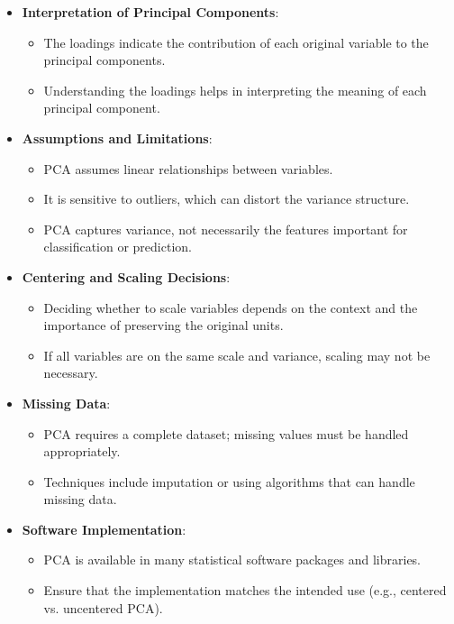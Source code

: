\documentclass{article}
\begin{document}
\begin{itemize}
    \item \textbf{Interpretation of Principal Components}:
    \begin{itemize}
        \item The loadings indicate the contribution of each original variable to the principal components.
        \item Understanding the loadings helps in interpreting the meaning of each principal component.
    \end{itemize}
    \item \textbf{Assumptions and Limitations}:
    \begin{itemize}
        \item PCA assumes linear relationships between variables.
        \item It is sensitive to outliers, which can distort the variance structure.
        \item PCA captures variance, not necessarily the features important for classification or prediction.
    \end{itemize}
    \item \textbf{Centering and Scaling Decisions}:
    \begin{itemize}
        \item Deciding whether to scale variables depends on the context and the importance of preserving the original units.
        \item If all variables are on the same scale and variance, scaling may not be necessary.
    \end{itemize}
    \item \textbf{Missing Data}:
    \begin{itemize}
        \item PCA requires a complete dataset; missing values must be handled appropriately.
        \item Techniques include imputation or using algorithms that can handle missing data.
    \end{itemize}
    \item \textbf{Software Implementation}:
    \begin{itemize}
        \item PCA is available in many statistical software packages and libraries.
        \item Ensure that the implementation matches the intended use (e.g., centered vs. uncentered PCA).
    \end{itemize}
\end{itemize}
\end{document}
